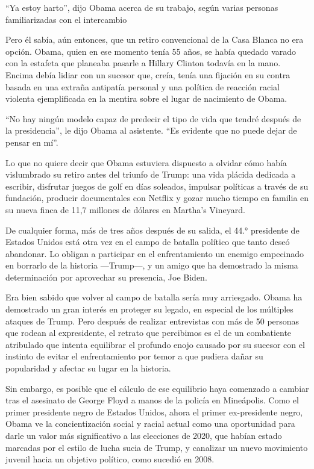 ``Ya estoy harto'', dijo Obama acerca de su trabajo, según varias
personas familiarizadas con el intercambio

Pero él sabía, aún entonces, que un retiro convencional de la Casa
Blanca no era opción. Obama, quien en ese momento tenía 55 años, se
había quedado varado con la estafeta que planeaba pasarle a Hillary
Clinton todavía en la mano. Encima debía lidiar con un sucesor que,
creía, tenía una fijación en su contra basada en una extraña antipatía
personal y una política de reacción racial violenta ejemplificada en la
mentira sobre el lugar de nacimiento de Obama.

``No hay ningún modelo capaz de predecir el tipo de vida que tendré
después de la presidencia'', le dijo Obama al asistente. ``Es evidente
que no puede dejar de pensar en mí''.

Lo que no quiere decir que Obama estuviera dispuesto a olvidar cómo
había vislumbrado su retiro antes del triunfo de Trump: una vida plácida
dedicada a escribir, disfrutar juegos de golf en días soleados, impulsar
políticas a través de su fundación, producir documentales con Netflix y
gozar mucho tiempo en familia en su nueva finca de 11,7 millones de
dólares en Martha's Vineyard.

De cualquier forma, más de tres años después de su salida, el 44.°
presidente de Estados Unidos está otra vez en el campo de batalla
político que tanto deseó abandonar. Lo obligan a participar en el
enfrentamiento un enemigo empecinado en borrarlo de la historia
---Trump---, y un amigo que ha demostrado la misma determinación por
aprovechar su presencia, Joe Biden.

Era bien sabido que volver al campo de batalla sería muy arriesgado.
Obama ha demostrado un gran interés en proteger su legado, en especial
de los múltiples ataques de Trump. Pero después de realizar entrevistas
con más de 50 personas que rodean al expresidente, el retrato que
percibimos es el de un combatiente atribulado que intenta equilibrar el
profundo enojo causado por su sucesor con el instinto de evitar el
enfrentamiento por temor a que pudiera dañar su popularidad y afectar su
lugar en la historia.

Sin embargo, es posible que el cálculo de ese equilibrio haya comenzado
a cambiar tras el asesinato de George Floyd a manos de la policía en
Mineápolis. Como el primer presidente negro de Estados Unidos, ahora el
primer ex-presidente negro, Obama ve la concientización social y racial
actual como una oportunidad para darle un valor más significativo a las
elecciones de 2020, que habían estado marcadas por el estilo de lucha
sucia de Trump, y canalizar un nuevo movimiento juvenil hacia un
objetivo político, como sucedió en 2008.

